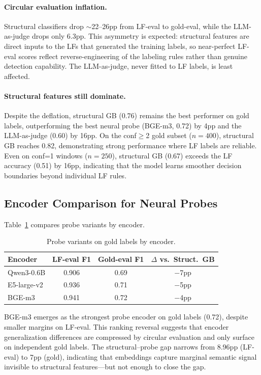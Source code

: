 \documentclass[11pt]{article}
\begin{document}
\paragraph{Circular evaluation inflation.}
Structural classifiers drop $\sim$22--26pp from LF-eval to gold-eval, while the LLM-as-judge drops only 6.3pp. This asymmetry is expected: structural features are direct inputs to the LFs that generated the training labels, so near-perfect LF-eval scores reflect reverse-engineering of the labeling rules rather than genuine detection capability. The LLM-as-judge, never fitted to LF labels, is least affected.

\paragraph{Structural features still dominate.}
Despite the deflation, structural GB (0.76) remains the best performer on gold labels, outperforming the best neural probe (BGE-m3, 0.72) by 4pp and the LLM-as-judge (0.60) by 16pp. On the conf$\geq$2 gold subset ($n\!=\!400$), structural GB reaches 0.82, demonstrating strong performance where LF labels are reliable. Even on conf=1 windows ($n\!=\!250$), structural GB (0.67) exceeds the LF accuracy (0.51) by 16pp, indicating that the model learns smoother decision boundaries beyond individual LF rules.

\subsection{Encoder Comparison for Neural Probes}

Table~\ref{tab:probe-variants} compares probe variants by encoder.

\begin{table}[t]
\centering
\small
\caption{Probe variants on gold labels by encoder.}
\label{tab:probe-variants}
\begin{tabular}{lccc}
\toprule
Encoder & LF-eval F1 & Gold-eval F1 & $\Delta$ vs.\ Struct.\ GB \\
\midrule
Qwen3-0.6B & 0.906 & 0.69 & $-$7pp \\
E5-large-v2 & 0.936 & 0.71 & $-$5pp \\
BGE-m3 & 0.941 & 0.72 & $-$4pp \\
\bottomrule
\end{tabular}
\end{table}

BGE-m3 emerges as the strongest probe encoder on gold labels (0.72), despite smaller margins on LF-eval. This ranking reversal suggests that encoder generalization differences are compressed by circular evaluation and only surface on independent gold labels. The structural--probe gap narrows from 8.96pp (LF-eval) to 7pp (gold), indicating that embeddings capture marginal semantic signal invisible to structural features---but not enough to close the gap.
\end{document}
